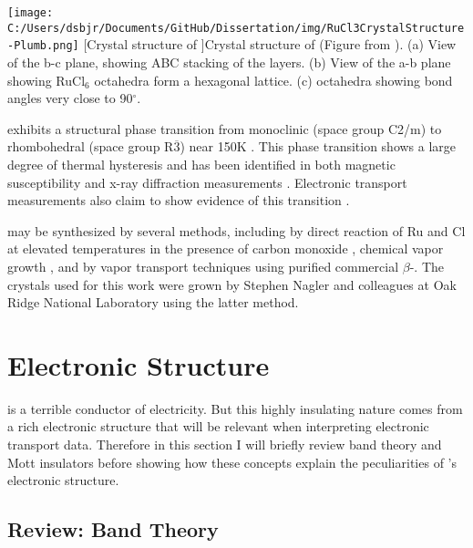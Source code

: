 \begin{centering}
\texttt{[image: C:/Users/dsbjr/Documents/GitHub/Dissertation/img/RuCl3CrystalStructure-Plumb.png]}
  \captionsetup{width=0.75\textwidth}
  [Crystal structure of \ruclnospace]{Crystal structure of \rucl (Figure from \cite{Plumb2014}). (a) View of the b-c plane, showing ABC stacking of the layers. (b) View of the a-b plane showing RuCl$_{6}$ octahedra form a hexagonal lattice. (c) \rucl octahedra showing bond angles very close to 90$^{\circ}$.} 
  \label{fig:RuCl3CrystStruct-1}
\end{centering}

\rucl exhibits a structural phase transition from monoclinic (space group C2/m) to rhombohedral (space group R$\overline{3}$) near 150K \cite{Glamazda2017}. This phase transition shows a large degree of thermal hysteresis and has been identified in both magnetic susceptibility and x-ray diffraction measurements \cite{Park2016}. Electronic transport measurements also claim to show evidence of this transition \cite{Mashhadi2018}.

\rucl may be synthesized by several methods, including by direct reaction of Ru and Cl at elevated temperatures in the presence of carbon monoxide \cite{Binotto1971}, chemical vapor growth \cite{Gronke2018}, and by vapor transport techniques using purified commercial $\beta$-\ruclnospace \cite{Cao2016}. The \rucl crystals used for this work were grown by Stephen Nagler and colleagues at Oak Ridge National Laboratory using the latter method.

\section{Electronic Structure}

\rucl is a terrible conductor of electricity. But this highly insulating nature comes from a rich electronic structure that will be relevant when interpreting electronic transport data. Therefore in this section I will briefly review band theory and Mott insulators before showing how these concepts explain the peculiarities of \ruclnospace 's electronic structure.

\subsection{Review: Band Theory}

